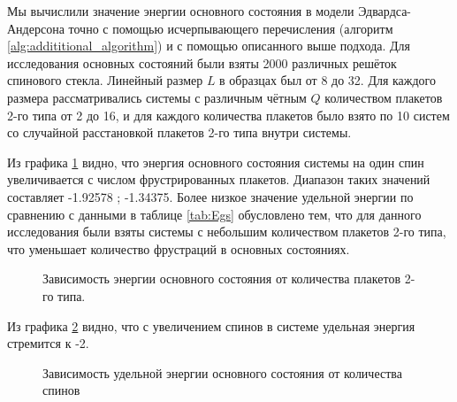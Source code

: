 \documentclass[utf8, babel, sor, jor, amsmath, amssymb, reprint]{elsarticle} %
\begin{document}
Мы вычислили значение энергии основного состояния в модели Эдвардса-Андерсона точно с помощью исчерпывающего перечисления (алгоритм \ref{alg:addititional_algorithm}) и с помощью описанного выше подхода. Для исследования основных состояний были взяты 2000 различных решёток спинового стекла. Линейный размер $L$ в образцах был от 8 до 32.
Для каждого размера рассматривались системы с различным чётным $Q$ количеством плакетов 2-го типа от 2 до 16, и для каждого количества плакетов было взято по 10 систем со случайной расстановкой плакетов 2-го типа внутри системы. %

Из графика \ref{fig:Egs_N_F} видно, что энергия основного состояния системы на один спин увеличивается с числом фрустрированных плакетов. Диапазон таких значений составляет -1.92578 ; -1.34375. Более низкое значение удельной энергии по сравнению с данными в таблице \ref{tab:Egs} обусловлено тем, что для данного исследования были взяты системы с небольшим количеством плакетов 2-го типа, что уменьшает количество фрустраций в основных состояниях.

\begin{figure}[H]
	\centering
	\caption{Зависимость энергии основного состояния от количества плакетов 2-го типа.}
	\label{fig:Egs_N_F}
\end{figure}

Из графика \ref{fig:Egs____N_F} видно, что с увеличением спинов в системе удельная энергия стремится к -2.

\begin{figure}[H]
	\centering
	\caption{Зависимость удельной энергии основного состояния от количества спинов}
	\label{fig:Egs____N_F}
\end{figure}
\end{document}
